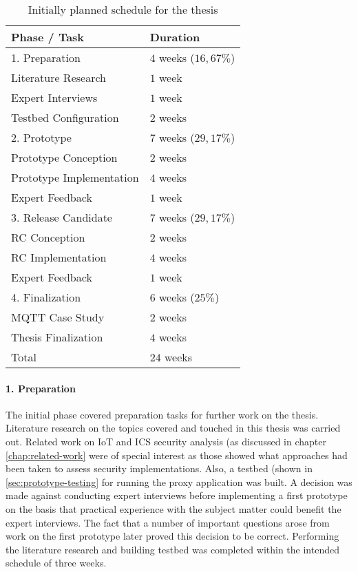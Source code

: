 \begin{table}
    \centering
    \begin{tabular}{l l}
        \toprule
        Phase / Task             & Duration              \\
        \midrule
        1. Preparation           & $4$ weeks ($16,67\%$) \\
        \midrule
        Literature Research      & $1$ week              \\
        Expert Interviews        & $1$ week              \\
        Testbed Configuration    & $2$ weeks             \\
        \midrule
        2. Prototype             & $7$ weeks ($29,17\%$) \\
        \midrule
        Prototype Conception     & $2$ weeks             \\
        Prototype Implementation & $4$ weeks             \\
        Expert Feedback          & $1$ week              \\
        \midrule
        3. Release Candidate     & $7$ weeks ($29,17\%$) \\
        \midrule
        RC Conception            & $2$ weeks             \\
        RC Implementation        & $4$ weeks             \\
        Expert Feedback          & $1$ week              \\
        \midrule
        4. Finalization          & $6$ weeks ($25\%$)    \\
        \midrule
        MQTT Case Study          & $2$ weeks             \\
        Thesis Finalization      & $4$ weeks             \\
        \midrule
        \midrule
        Total                    & $24$ weeks            \\
        \bottomrule
    \end{tabular}
    \caption{Initially planned schedule for the thesis}
    \label{fig:thesis-schedule}
\end{table}

\paragraph{1. Preparation} The initial phase covered preparation tasks for further work on the thesis. Literature research on the topics covered and touched in this thesis was carried out. Related work on \ac{IoT} and \ac{ICS} security analysis (as discussed in chapter \ref{chap:related-work} were of special interest as those showed what approaches had been taken to assess security implementations. Also, a testbed (shown in \ref{sec:prototype-testing} for running the proxy application was built. A decision was made against conducting expert interviews before implementing a first prototype on the basis that practical experience with the subject matter could benefit the expert interviews. The fact that a number of important questions arose from work on the first prototype later proved this decision to be correct. Performing the literature research and building testbed was completed within the intended schedule of three weeks.
